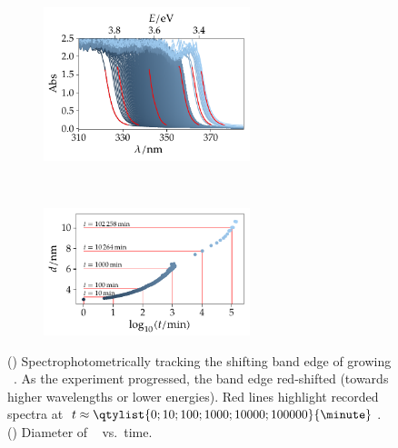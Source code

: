 \documentclass[draft,webedition,openright,titles,swedish,english]{LuaUUThesis}\usepackage[]{graphicx}\usepackage[]{xcolor}
\newenvironment{knitrout}{}{} %
\newcommand{\vs}{vs.}
\newcommand{\versus}{\vs}
\begin{document}
\begin{figure}[tbp]
\centering
\begin{subfigure}[b]{0.48\textwidth}
\centering
%
\begin{knitrout}\scriptsize
{}\color{fgcolor}

{\centering \includegraphics[width=2.36in]{figure/0600-fig-abs-vs-wl-1} 

}


\end{knitrout}
\caption{}
\label{fig:6500-abs-vs-wavelength}
\end{subfigure}%
\,%
\begin{subfigure}[b]{0.48\textwidth}
\centering
%
\begin{knitrout}\scriptsize
{}\color{fgcolor}

{\centering \includegraphics[width=2.36in]{figure/0600-fig-diameter-vs-time-1} 

}


\end{knitrout}
\caption{}
\label{fig:6500-diameter-vs-time}
\end{subfigure}%
\caption[Growing ZnO QDs tracked spectrophotometrically]{%
   ()
   Spectrophotometrically tracking the shifting band edge of growing \zincox\ \protect{}.
   As the experiment progressed, the band edge red-shifted (towards higher wavelengths or lower energies).
   Red lines highlight recorded spectra at $t\approx\qtylist{0;10;100;1000;10000;100000}{\minute}$.
   ()
   Diameter of \zincox\ \protect{} \versus\ time.
}
\label{fig:6500-ZnO-QD-tracked}
\end{figure}
\end{document}
